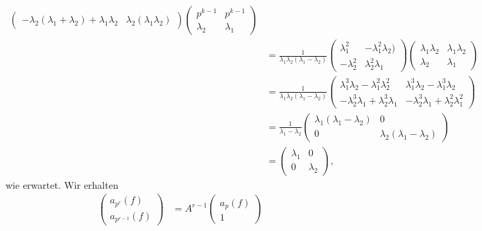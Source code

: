 \documentclass{article}
\begin{document}
\begin{enumerate}[(a)]
\begin{align*}
\begin{pmatrix}
            -\lambda_2 (\lambda_1 + \lambda_2) + \lambda_1\lambda_2 & \lambda_2 (\lambda_1\lambda_2)
        \end{pmatrix} \begin{pmatrix}
            p^{k-1} & p^{k-1}\\
            \lambda_2 & \lambda_1
        \end{pmatrix}\\
        &= \frac{1}{\lambda_1\lambda_2(\lambda_1 - \lambda_2)}\begin{pmatrix}
            \lambda_1^2 & -\lambda_1^2 \lambda_2)\\
            -\lambda_2^2& \lambda_2^2 \lambda_1
        \end{pmatrix} \begin{pmatrix}
            \lambda_1 \lambda_2 & \lambda_1\lambda_2\\
            \lambda_2 & \lambda_1
        \end{pmatrix}\\
        &= \frac{1}{\lambda_1\lambda_2(\lambda_1 - \lambda_2)}\begin{pmatrix}
            \lambda_1^3\lambda_2 - \lambda_1^2 \lambda_2^2 & \lambda_1^3\lambda_2  - \lambda_1^3\lambda_2\\
            -\lambda_2^3\lambda_1 + \lambda_2^3\lambda_1 & - \lambda_2^3\lambda_1 + \lambda_2^2\lambda_1^2
        \end{pmatrix}\\
        &= \frac{1}{\lambda_1 - \lambda_2}\begin{pmatrix}
            \lambda_1 (\lambda_1 - \lambda_2) & 0\\
            0 & \lambda_2 (\lambda_1 - \lambda_2)
        \end{pmatrix}\\
        &= \begin{pmatrix}
            \lambda_1 & 0\\
            0 & \lambda_2
        \end{pmatrix},
    \end{align*}
    wie erwartet.
    Wir erhalten
    \begin{align*}
        \begin{pmatrix}
            a_{p^r}(f)\\
            a_{p^{r-1}}(f)
        \end{pmatrix} &= A^{r-1} \begin{pmatrix}
            a_p(f)\\1
        \end{pmatrix}

\end{align*}
\end{enumerate}
\end{document}
